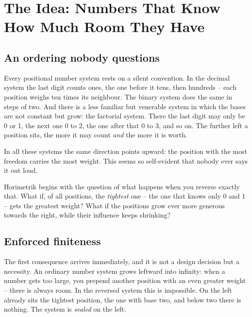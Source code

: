 \chapter{The Idea: Numbers That Know How Much Room They Have}
\label{ch:idee}


\section{An ordering nobody questions}

Every positional number system rests on a silent convention. In the
decimal system the last digit counts ones, the one before it tens,
then hundreds -- each position weighs ten times its neighbour. The
binary system does the same in steps of two. And there is a less
familiar but venerable system in which the bases are not constant
but grow: the factorial system. There the last digit may only be 0
or 1, the next one 0 to 2, the one after that 0 to 3, and so on.
The further left a position sits, the more it may count \emph{and}
the more it is worth.

In all these systems the same direction points upward: the position
with the most freedom carries the most weight. This seems so
self-evident that nobody ever says it out loud.

Horimetrik begins with the question of what happens when you
reverse exactly that. What if, of all positions, the
\emph{tightest} one -- the one that knows only 0 and 1 -- gets the
greatest weight? What if the positions grow ever more generous
towards the right, while their influence keeps shrinking?

\section{Enforced finiteness}

The first consequence arrives immediately, and it is not a design
decision but a necessity. An ordinary number system grows leftward
into infinity: when a number gets too large, you prepend another
position with an even greater weight -- there is always room. In
the reversed system this is impossible. On the left already sits
the tightest position, the one with base two, and below two there
is nothing. The system is \emph{sealed} on the left.

